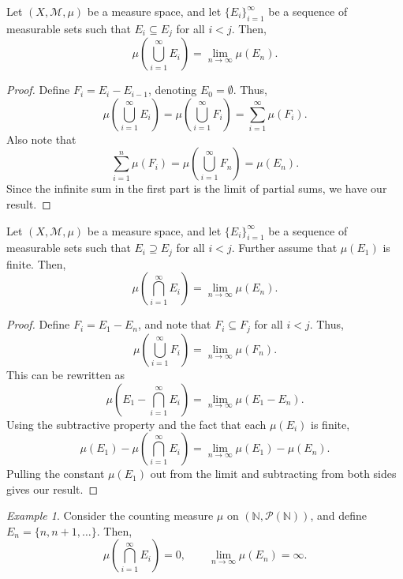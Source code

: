\documentclass[11pt]{article}
\newcommand{\N}{\mathbb{N}}
\newcommand{\M}{\mathcal{M}}
\theoremstyle{definition}
\theoremstyle{remark}
\newtheorem*{example}{Example}
\numberwithin{equation}{section}
\begin{document}
    \begin{theorem}
        Let $(X, \M, \mu)$ be a measure space, and let $\{E_i\}_{i = 1}^\infty$
        be a sequence of measurable sets such that $E_i \subseteq E_j$ for all $i <
        j$. Then, \[
            \mu\left(\bigcup_{i = 1}^\infty E_i\right) = \lim_{n \to \infty}
            \mu(E_n).
        \]
    \end{theorem}
    \begin{proof}
        Define $F_i = E_i - E_{i - 1}$, denoting $E_0 = \emptyset$. Thus, \[
            \mu\left(\bigcup_{i = 1}^\infty E_i\right) = \mu\left(\bigcup_{i =
            1}^\infty F_i\right) = \sum_{i = 1}^\infty \mu(F_i).
        \] Also note that \[
            \sum_{i = 1}^n \mu(F_i) = \mu\left(\bigcup_{i = 1}^\infty F_n\right) =
            \mu(E_n).
        \] Since the infinite sum in the first part is the limit of partial sums, we
        have our result.
    \end{proof}

    \begin{theorem}
        Let $(X, \M, \mu)$ be a measure space, and let $\{E_i\}_{i = 1}^\infty$
        be a sequence of measurable sets such that $E_i \supseteq E_j$ for all $i <
        j$. Further assume that $\mu(E_1)$ is finite. Then, \[
            \mu\left(\bigcap_{i = 1}^\infty E_i\right) = \lim_{n \to \infty}
            \mu(E_n).
        \]
    \end{theorem}
    \begin{proof}
        Define $F_i = E_1 - E_n$, and note that $F_i \subseteq F_j$ for all $i < j$.
        Thus, \[
            \mu\left(\bigcup_{i = 1}^\infty F_i\right) = \lim_{n \to \infty}
            \mu(F_n).
        \] This can be rewritten as \[
            \mu\left(E_1 - \bigcap_{i = 1}^\infty E_i\right) = \lim_{n \to \infty}
            \mu(E_1 - E_n).
        \] Using the subtractive property and the fact that each $\mu(E_i)$ is
        finite, \[
            \mu(E_1) - \mu\left(\bigcap_{i = 1}^\infty E_i\right) = \lim_{n \to \infty}
            \mu(E_1) - \mu(E_n).
        \] Pulling the constant $\mu(E_1)$ out from the limit and subtracting from
        both sides gives our result.
    \end{proof}
    \begin{example}
        Consider the counting measure $\mu$ on $(\N, \mathcal{P}(\N))$, and define
        $E_n = \{n, n + 1, \dots \}$. Then, \[
            \mu\left(\bigcap_{i = 1}^\infty E_i\right) = 0, \qquad \lim_{n \to
            \infty} \mu(E_n) = \infty.
        \]
    \end{example}
\end{document}
